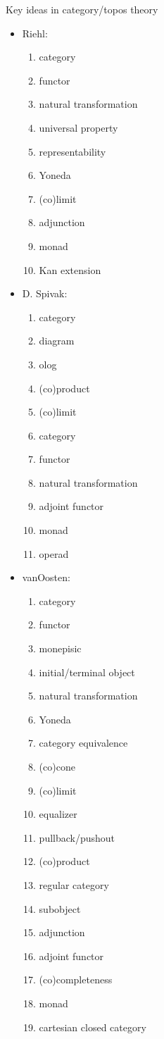 \begin{plSection}{Key ideas in category/topos theory}
\begin{itemize}
\item Riehl:~\cite{Riehl:2017:CatTheory}
\begin{enumerate}
  \item category
  \item functor
  \item natural transformation
  \item universal property
  \item representability
  \item Yoneda
  \item (co)limit
  \item adjunction
  \item monad
  \item Kan extension
\end{enumerate}

\item D. Spivak:~\cite{Spivak:2013:CatTheoryForScientists}
\begin{enumerate}
  \item category
  \item diagram
  \item olog
  \item (co)product
  \item (co)limit
  \item category
  \item functor
  \item natural transformation
  \item adjoint functor
  \item monad
  \item operad
\end{enumerate}

\item vanOosten:\cite{VanOosten:2002:CatTheory}
\begin{enumerate}
  \item category
  \item functor
  \item monepisic
  \item initial/terminal object
  \item natural transformation
  \item Yoneda
  \item category equivalence
  \item (co)cone
  \item (co)limit
  \item equalizer
  \item pullback/pushout
  \item (co)product
  \item regular category
  \item subobject
  \item adjunction
  \item adjoint functor
  \item (co)completeness
  \item monad
  \item cartesian closed category
 \end{enumerate}
\end{itemize}
  

\end{plSection}

